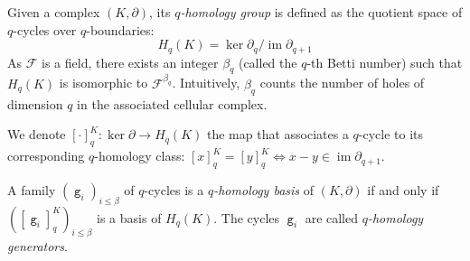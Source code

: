 \documentclass[runningheads]{llncs}
\DeclareMathOperator{\im}{im}	%
\DeclareMathOperator{\g}{\mathtt{g}}
\newcommand{\dr}{\partial}
\newcommand{\cplx}{{(K,\partial)} }
\newcommand{\ols}[1]{\mskip.5\thinmuskip\overline{\mskip-.5\thinmuskip {#1} \mskip-.5\thinmuskip}\mskip.5\thinmuskip} %
\newcommand{\equi}{\Longleftrightarrow}
\newcommand{\commentYS}[1]{{\textit{\color{blue}\textbf{YS}: #1}}}
\begin{document}


\begin{definition}\label{def:homology-group}
    Given a complex $(K,\dr)$, its \emph{$q$-homology group} is defined as the quotient space of $q$-cycles over $q$-boundaries:
    $$H_q(K) = {\ker\dr_q}/{\im\dr_{q+1}}$$
    As $\mathcal{F}$ is a field, there exists an integer $\beta_q$ (called the $q$-th Betti number) such that $H_q(K)$ is isomorphic to $\mathcal{F}^{\beta_q}$.
    Intuitively, $\beta_q$ counts the number of holes of dimension $q$ in the associated cellular complex.
\end{definition}
We denote $[\cdot]^K_q : \ker\dr \to H_q(K)$ the map that associates a $q$-cycle to its corresponding $q$-homology class: $[x]^K_q = [y]^K_q \equi x-y \in \im\dr_{q+1}$.

\begin{definition}\label{def:generators-homology-bases}
    A family $(\g_i)_{i\leq\beta}$ of $q$-cycles is a \emph{$q$-homology basis} of $\cplx$ if and only if $\left([\g_i]^K_q\right)_{i\leq\beta}$ is a basis of $H_q(K)$.
    The cycles $\g_i$ are called \emph{$q$-homology generators}.
\end{definition}
\end{document}
